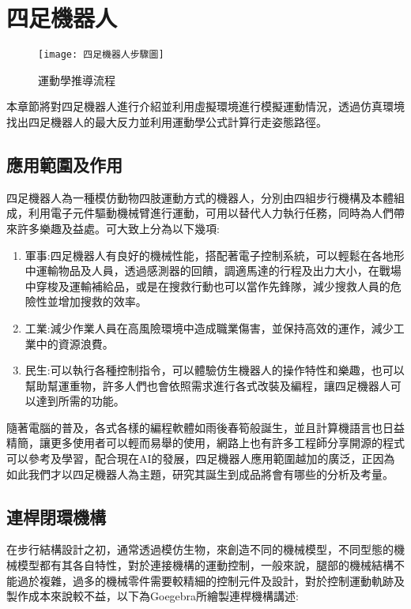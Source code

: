 
\chapter{四足機器人}
\begin{figure}[hbt!]
\begin{center}
\texttt{[image: 四足機器人步驟圖]}
\caption{\Large 運動學推導流程}\label{四足機器人步驟圖}
\end{center}
\end{figure}
本章節將對四足機器人進行介紹並利用虛擬環境進行模擬運動情況，透過仿真環境找出四足機器人的最大反力並利用運動學公式計算行走姿態路徑。\\

\section{應用範圍及作用}


四足機器人為一種模仿動物四肢運動方式的機器人，分別由四組步行機構及本體組成，利用電子元件驅動機械臂進行運動，可用以替代人力執行任務，同時為人們帶來許多樂趣及益處。可大致上分為以下幾項:\\
\begin{enumerate}
\item 軍事:四足機器人有良好的機械性能，搭配著電子控制系統，可以輕鬆在各地形中運輸物品及人員，透過感測器的回饋，調適馬達的行程及出力大小，在戰場中穿梭及運輸補給品，或是在搜救行動也可以當作先鋒隊，減少搜救人員的危險性並增加搜救的效率。\
\item 工業:減少作業人員在高風險環境中造成職業傷害，並保持高效的運作，減少工業中的資源浪費。\
\item 民生:可以執行各種控制指令，可以體驗仿生機器人的操作特性和樂趣，也可以幫助幫運重物，許多人們也會依照需求進行各式改裝及編程，讓四足機器人可以達到所需的功能。\
\end{enumerate}
\newpage

隨著電腦的普及，各式各樣的編程軟體如雨後春筍般誕生，並且計算機語言也日益精簡，讓更多使用者可以輕而易舉的使用，網路上也有許多工程師分享開源的程式可以參考及學習，配合現在AI的發展，四足機器人應用範圍越加的廣泛，正因為如此我們才以四足機器人為主題，研究其誕生到成品將會有哪些的分析及考量。\\

\section{連桿閉環機構}
在步行結構設計之初，通常透過模仿生物，來創造不同的機械模型，不同型態的機械模型都有其各自特性，對於連接機構的運動控制，一般來說，腿部的機械結構不能過於複雜，過多的機械零件需要較精細的控制元件及設計，對於控制運動軌跡及製作成本來說較不益，以下為Goegebra所繪製連桿機構講述:\\

